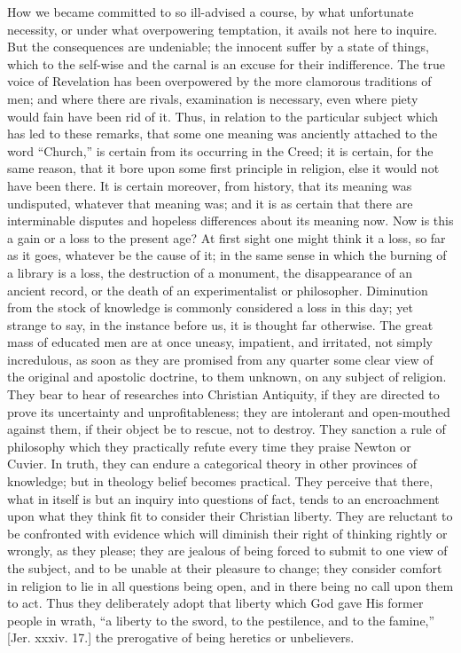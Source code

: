 How we became committed to so ill-advised a course, by what
unfortunate necessity, or under what overpowering temptation, it
avails not here to inquire. But the consequences are undeniable; the
innocent suffer by a state of things, which to the self-wise and the
carnal is an excuse for their indifference. The true voice of
Revelation has been overpowered by the more clamorous traditions of
men; and where there are rivals, examination is necessary, even where
piety would fain have been rid of it. Thus, in relation to the
particular subject which has led to these remarks, that some one
meaning was anciently attached to the word ``Church,'' is
certain from its occurring in the Creed; it is certain, for the same
reason, that it bore upon some first principle in religion, else it
would not have been there. It is certain moreover, from history, that
its meaning was undisputed, whatever that meaning was; and it is as
certain that there are interminable disputes and hopeless differences
about its meaning now. Now is this a gain or a loss to the present
age? At first sight one might think it a loss, so far as it goes,
whatever be the cause of it; in the same sense in which the burning of
a library is a loss, the destruction of a monument, the disappearance
of an ancient record, or the death of an experimentalist or
philosopher. Diminution from the stock of knowledge is commonly
considered a loss in this day; yet strange to say, in the instance
before us, it is thought far otherwise. The great mass of educated men
are at once uneasy, impatient, and irritated, not simply incredulous,
as soon as they are promised from any quarter some clear view of the
original and apostolic doctrine, to them unknown, on any subject of
religion. They bear to hear of researches into Christian
Antiquity, if they are directed to prove its uncertainty and
unprofitableness; they are intolerant and open-mouthed against them,
if their object be to rescue, not to destroy. They sanction a rule of
philosophy which they practically refute every time they praise Newton
or Cuvier. In truth, they can endure a categorical theory in other
provinces of knowledge; but in theology belief becomes practical. They
perceive that there, what in itself is but an inquiry into questions
of fact, tends to an encroachment upon what they think fit to consider
their Christian liberty. They are reluctant to be confronted with
evidence which will diminish their right of thinking rightly or
wrongly, as they please; they are jealous of being forced to submit to
one view of the subject, and to be unable at their pleasure to change;
they consider comfort in religion to lie in all questions being open,
and in there being no call upon them to act. Thus they deliberately
adopt that liberty which God gave His former people in wrath, ``a
liberty to the sword, to the pestilence, and to the famine,'' [Jer.
xxxiv. 17.] the prerogative of being heretics or unbelievers.

